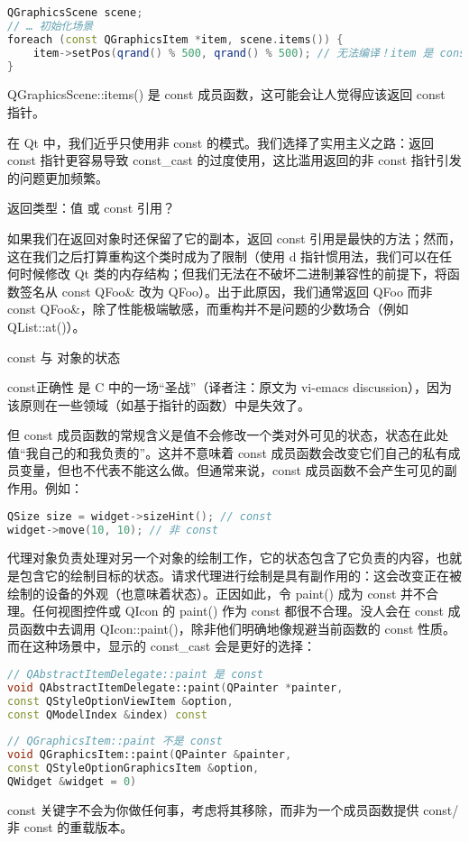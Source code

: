 \begin{lstlisting}[language=C++]
QGraphicsScene scene;
// … 初始化场景
foreach (const QGraphicsItem *item, scene.items()) {
	item->setPos(qrand() % 500, qrand() % 500); // 无法编译！item 是 const 指针
}
\end{lstlisting}

QGraphicsScene::items() 是 const 成员函数，这可能会让人觉得应该返回 const 指针。

在 Qt 中，我们近乎只使用非 const 的模式。我们选择了实用主义之路：返回 const 指针更容易导致 const\_cast 的过度使用，这比滥用返回的非 const 指针引发的问题更加频繁。

返回类型：值 或 const 引用？

如果我们在返回对象时还保留了它的副本，返回 const 引用是最快的方法；然而，这在我们之后打算重构这个类时成为了限制（使用 d 指针惯用法，我们可以在任何时候修改 Qt 类的内存结构；但我们无法在不破坏二进制兼容性的前提下，将函数签名从 const QFoo\& 改为 QFoo）。出于此原因，我们通常返回 QFoo 而非 const QFoo\&，除了性能极端敏感，而重构并不是问题的少数场合（例如 QList::at()）。

const 与 对象的状态

const正确性 是 C 中的一场“圣战”（译者注：原文为 vi-emacs discussion），因为该原则在一些领域（如基于指针的函数）中是失效了。

但 const 成员函数的常规含义是值不会修改一个类对外可见的状态，状态在此处值“我自己的和我负责的”。这并不意味着 const 成员函数会改变它们自己的私有成员变量，但也不代表不能这么做。但通常来说，const 成员函数不会产生可见的副作用。例如：

\begin{lstlisting}[language=C++]
QSize size = widget->sizeHint(); // const
widget->move(10, 10); // 非 const
\end{lstlisting}

代理对象负责处理对另一个对象的绘制工作，它的状态包含了它负责的内容，也就是包含它的绘制目标的状态。请求代理进行绘制是具有副作用的：这会改变正在被绘制的设备的外观（也意味着状态）。正因如此，令 paint() 成为 const 并不合理。任何视图控件或 QIcon 的 paint() 作为 const 都很不合理。没人会在 const 成员函数中去调用 QIcon::paint()，除非他们明确地像规避当前函数的 const 性质。而在这种场景中，显示的 const\_cast 会是更好的选择：

\begin{lstlisting}[language=C++]
// QAbstractItemDelegate::paint 是 const
void QAbstractItemDelegate::paint(QPainter *painter,
const QStyleOptionViewItem &option,
const QModelIndex &index) const
 
// QGraphicsItem::paint 不是 const
void QGraphicsItem::paint(QPainter &painter, 
const QStyleOptionGraphicsItem &option, 
QWidget &widget = 0)
\end{lstlisting}

const 关键字不会为你做任何事，考虑将其移除，而非为一个成员函数提供 const/非 const 的重载版本。

